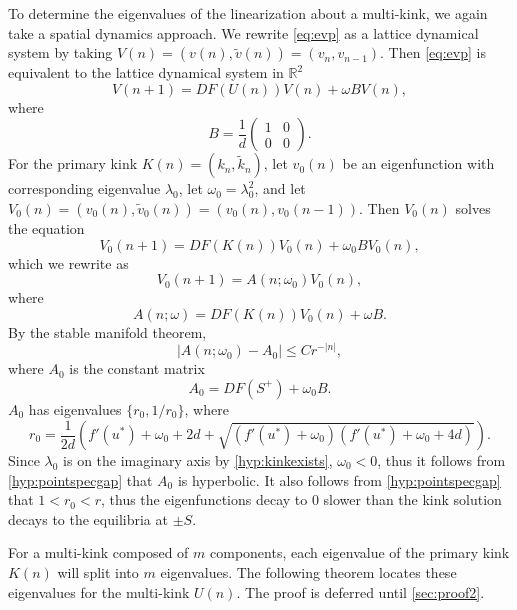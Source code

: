 \documentclass[12pt,reqno]{amsart}
\def\R{{\mathbb R}}
\begin{document}
To determine the eigenvalues of the linearization about a multi-kink, we again take a spatial dynamics approach. We rewrite \cref{eq:evp} as a lattice dynamical system by taking $V(n) = (v(n), \tilde{v}(n)) = (v_n, v_{n-1})$. Then \cref{eq:evp} is equivalent to the lattice dynamical system in $\R^2$
\begin{equation}\label{eq:EVPdyneq}
V(n+1) = D F( U(n) )V(n) + \omega B V(n),
\end{equation}
where
\[
B = \frac{1}{d}
\begin{pmatrix}1 & 0 \\ 0 & 0
\end{pmatrix}.
\] 
For the primary kink $K(n) = (k_n, \tilde{k}_n)$, let $v_0(n)$ be an eigenfunction with corresponding eigenvalue $\lambda_0$, let $\omega_0 = \lambda_0^2$, and let $V_0(n) = (v_0(n), \tilde{v}_0(n)) = (v_0(n), v_0(n-1))$. Then $V_0(n)$ solves the equation
\begin{equation}\label{eq:V0eq}
V_0(n+1) = D F( K(n) )V_0(n) + \omega_0 B V_0(n),
\end{equation}
which we rewrite as
\begin{equation}\label{eq:V0Aeq}
	V_0(n+1) = A(n; \omega_0) V_0(n),
\end{equation}
where
\begin{equation}\label{eq:Aomegaeq}
	A(n; \omega) = D F( K(n) )V_0(n) + \omega B.
\end{equation}
By the stable manifold theorem, 
\begin{equation}\label{eq:A0decay}
	|A(n; \omega_0) - A_0| \leq C r^{-|n|},
\end{equation}
where $A_0$ is the constant matrix
\begin{equation}
	A_0 = DF(S^+) + \omega_0 B.
\end{equation}
$A_0$ has eigenvalues $\{ r_0, 1/r_0 \}$, where
\begin{equation}\label{eq:r0}
r_0 = \frac{1}{2d}\left( f'(u^*) + \omega_0 + 2d + \sqrt{(f'(u^*)+ \omega_0)(f'(u^*) + \omega_0 + 4d)} \right).
\end{equation}
{
Since $\lambda_0$ is on the imaginary axis by \cref{hyp:kinkexists}, $\omega_0 < 0$, thus it follows from \cref{hyp:pointspecgap} that $A_0$ is hyperbolic.
}
It also follows from \cref{hyp:pointspecgap} that $1 < r_0 < r$, thus the eigenfunctions decay to 0 slower than the kink solution decays to the equilibria at $\pm S$.

For a multi-kink composed of $m$ components, each eigenvalue of the primary kink $K(n)$ will split into $m$ eigenvalues. The following theorem locates these eigenvalues for the multi-kink $U(n)$. The proof is deferred until \cref{sec:proof2}.
\end{document}
